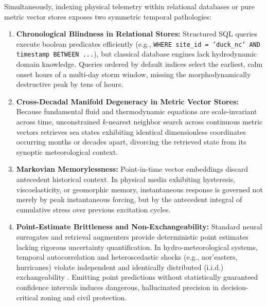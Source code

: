 \documentclass[journal]{IEEEtran}
\begin{document}
Simultaneously, indexing physical telemetry within relational databases or pure metric vector stores exposes two symmetric temporal pathologies:
\begin{enumerate}
    \item \textbf{Chronological Blindness in Relational Stores:} Structured SQL queries execute boolean predicates efficiently (e.g., \texttt{WHERE site\_id = 'duck\_nc' AND timestamp BETWEEN ...}), but classical database engines lack hydrodynamic domain knowledge. Queries ordered by default indices select the earliest, calm onset hours of a multi-day storm window, missing the morphodynamically destructive peak by tens of hours.
    \item \textbf{Cross-Decadal Manifold Degeneracy in Metric Vector Stores:} Because fundamental fluid and thermodynamic equations are scale-invariant across time, unconstrained $k$-nearest neighbor search across continuous metric vectors retrieves sea states exhibiting identical dimensionless coordinates occurring months or decades apart, divorcing the retrieved state from its synoptic meteorological context.
    \item \textbf{Markovian Memorylessness:} Point-in-time vector embeddings discard antecedent historical context. In physical media exhibiting hysteresis, viscoelasticity, or geomorphic memory, instantaneous response is governed not merely by peak instantaneous forcing, but by the antecedent integral of cumulative stress over previous excitation cycles.
    \item \textbf{Point-Estimate Brittleness and Non-Exchangeability:} Standard neural surrogates and retrieval augmenters provide deterministic point estimates lacking rigorous uncertainty quantification. In hydro-meteorological systems, temporal autocorrelation and heteroscedastic shocks (e.g., nor'easters, hurricanes) violate independent and identically distributed (i.i.d.) exchangeability \cite{barber2023conformal}. Emitting point predictions without statistically guaranteed confidence intervals induces dangerous, hallucinated precision in decision-critical zoning and civil protection.
\end{enumerate}
\end{document}
